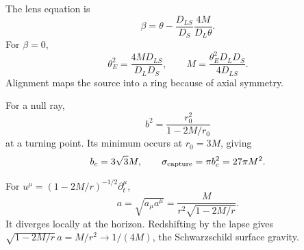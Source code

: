 \begin{solution}
The lens equation is
\[
\beta=\theta-\frac{D_{LS}}{D_S}\frac{4M}{D_L\theta}.
\]
For \(\beta=0\),
\[
\theta_E^2=\frac{4M D_{LS}}{D_LD_S},\qquad
M=\frac{\theta_E^2D_LD_S}{4D_{LS}}.
\]
Alignment maps the source into a ring because of axial symmetry.
\end{solution}

\begin{solution}
For a null ray,
\[
b^2=\frac{r_0^2}{1-2M/r_0}
\]
at a turning point.  Its minimum occurs at \(r_0=3M\), giving
\[
b_c=3\sqrt3M,\qquad \sigma_{\rm capture}=\pi b_c^2=27\pi M^2.
\]
\end{solution}

\begin{solution}
For \(u^\mu=(1-2M/r)^{-1/2}\partial_t^\mu\),
\[
a=\sqrt{a_\mu a^\mu}
=\frac{M}{r^2\sqrt{1-2M/r}}.
\]
It diverges locally at the horizon.  Redshifting by the lapse gives
\(\sqrt{1-2M/r}\,a=M/r^2\to1/(4M)\), the Schwarzschild surface gravity.
\end{solution}
